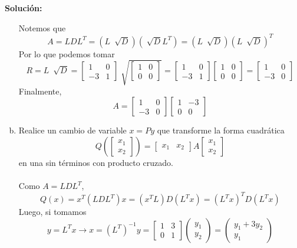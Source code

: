 \documentclass[12pt]{article}
\newenvironment{solucion}
{\begin{mdframed}[backgroundcolor=black!10]
		{\bf Solución:}\\
	}
	{
	\end{mdframed}
}
\newenvironment{preguntas}
{\begin{enumerate}\itemsep12pt
	}
	{
	\end{enumerate}
}
\newcommand{\ra}{\rightarrow}
\begin{document}
\begin{preguntas}
\begin{solucion}
\begin{enumerate}[a)]
Notemos que
$$A = LDL^T = (L\ \sqrt[]{D})(\sqrt[]{D}L^T) = (L\ \sqrt[]{D})(L\ \sqrt[]{D})^T$$
Por lo que podemos tomar
$$R =  L\ \sqrt[]{D} = 
\begin{bmatrix}1 & 0 \\ -3 & 1\end{bmatrix}
\sqrt[]{\begin{bmatrix}1 & 0 \\ 0 & 0\end{bmatrix}} =
\begin{bmatrix}1 & 0 \\ -3 & 1\end{bmatrix}
\begin{bmatrix}1 & 0 \\ 0 & 0\end{bmatrix} =
\begin{bmatrix}1 & 0 \\ -3 & 0\end{bmatrix}
$$
Finalmente,
$$A = 
\begin{bmatrix}1 & 0 \\ -3 & 0\end{bmatrix}
\begin{bmatrix}1 & -3 \\ 0 & 0\end{bmatrix}
$$
\item Realice un cambio de variable $x=Py$ que transforme la forma cuadrática
$$Q\left(\begin{bmatrix}x_1\\x_2\end{bmatrix}\right) = \begin{bmatrix}x_1& x_2\end{bmatrix}A\begin{bmatrix}x_1\\ x_2\end{bmatrix}$$
en una sin términos con producto cruzado.\\
\\
Como $A = LDL^T$,	
$$Q(x) = x^T(LDL^T)x = (x^TL)D(L^Tx) = (L^Tx)^TD(L^Tx)$$
Luego, si tomamos
$$y = L^Tx \ra x = (L^T)^{-1}y = 
\begin{bmatrix}
1 & 3 \\
0 & 1
\end{bmatrix}
\begin{pmatrix}
y_1 \\ y_2
\end{pmatrix}
= 
\begin{pmatrix}
y_1 + 3y_2 \\ y_1
\end{pmatrix}$$

\end{enumerate}
\end{solucion}
\end{preguntas}
\end{document}
